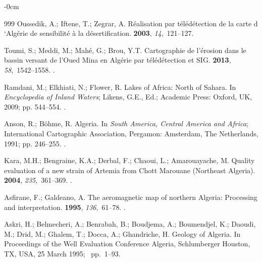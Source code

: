 \documentclass[asi,article,accept,pdftex,moreauthors]{Definitions/mdpi}
\begin{document}
\begin{adjustwidth}{-\extralength}{0cm}
\begin{thebibliography}{999}
Oussedik, A.; Iftene, T.; Zegrar, A.
\newblock R{\'e}alisation par t{\'e}l{\'e}d{\'e}tection de la carte d
  ‘Alg{\'e}rie de sensibilit{\'e} {\`a} la d{\'e}sertification.
 {\bf
  2003}, {\em 14},~121--127.

Toumi, S.; Meddi, M.; Mahé, G.; Brou, Y.T.
\newblock Cartographie de l’érosion dans le bassin versant de l’Oued Mina
  en Algérie par télédétection et SIG.
 {\bf 2013}, {\em 58},~1542--1558.
.

Ramdani, M.; Elkhiati, N.; Flower, R.
\newblock Lakes of Africa: North of Sahara. In {\em Encyclopedia of Inland
  Waters}; Likens, G.E., Ed.; Academic Press: Oxford, UK, 2009; pp. 544--554.
.

Anson, R.; Böhme, R.
\newblock Algeria. In {\em South America, Central America and Africa};
  International Cartographic Association, Pergamon: Amsterdam,  The Netherlands,
1991; pp. 246--255.
.

Kara, M.H.; Bengraine, K.A.; Derbal, F.; Chaoui, L.; Amarouayache, M.
\newblock Quality evaluation of a new strain of Artemia from Chott Marouane
  (Northeast Algeria).
 {\bf 2004}, {\em 235},~361--369.
.

Asfirane, F.; Galdeano, A.
\newblock The aeromagnetic map of northern Algeria: Processing and
  interpretation.
 {\bf 1995}, {\em
  136},~61--78.
.

Askri, H.; Belmecheri, A.; Benrabah, B.; Boudjema, A.; Boumendjel, K.; Daoudi,
  M.; Drid, M.; Ghalem, T.; Docca, A.; Ghandriche, H.
\newblock Geology of Algeria.
\newblock In Proceedings of the Well Evaluation Conference Algeria, Schlumberger Houston, TX, USA, 25 March 1995; %
\mbox{ pp. 1--93.}


\end{thebibliography}
\end{adjustwidth}
\end{document}
